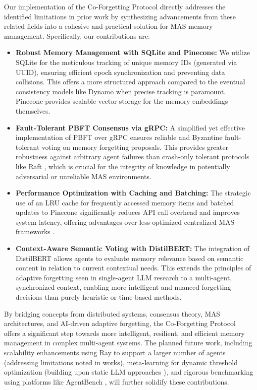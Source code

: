 \documentclass[conference]{IEEEtran}
\begin{document}
Our implementation of the Co-Forgetting Protocol directly addresses the identified limitations in prior work by synthesizing advancements from these related fields into a cohesive and practical solution for MAS memory management. Specifically, our contributions are:
\begin{itemize}
    \item \textbf{Robust Memory Management with SQLite and Pinecone:} We utilize SQLite for the meticulous tracking of unique memory IDs (generated via UUID), ensuring efficient epoch synchronization and preventing data collisions. This offers a more structured approach compared to the eventual consistency models like Dynamo \cite{DeCandia2007} when precise tracking is paramount. Pinecone provides scalable vector storage for the memory embeddings themselves.
    \item \textbf{Fault-Tolerant PBFT Consensus via gRPC:} A simplified yet effective implementation of PBFT over gRPC ensures reliable and Byzantine fault-tolerant voting on memory forgetting proposals. This provides greater robustness against arbitrary agent failures than crash-only tolerant protocols like Raft \cite{Ongaro2014}, which is crucial for the integrity of knowledge in potentially adversarial or unreliable MAS environments.
    \item \textbf{Performance Optimization with Caching and Batching:} The strategic use of an LRU cache for frequently accessed memory items and batched updates to Pinecone significantly reduces API call overhead and improves system latency, offering advantages over less optimized centralized MAS frameworks \cite{Wooldridge2009}.
    \item \textbf{Context-Aware Semantic Voting with DistilBERT:} The integration of DistilBERT allows agents to evaluate memory relevance based on semantic content in relation to current contextual needs. This extends the principles of adaptive forgetting seen in single-agent LLM research to a multi-agent, synchronized context, enabling more intelligent and nuanced forgetting decisions than purely heuristic or time-based methods.
\end{itemize}

By bridging concepts from distributed systems, consensus theory, MAS architectures, and AI-driven adaptive forgetting, the Co-Forgetting Protocol offers a significant step towards more intelligent, resilient, and efficient memory management in complex multi-agent systems. The planned future work, including scalability enhancements using Ray to support a larger number of agents (addressing limitations noted in works), meta-learning for dynamic threshold optimization (building upon static LLM approaches \cite{Finn2017}), and rigorous benchmarking using platforms like AgentBench \cite{Liu2023agentbench}, will further solidify these contributions.
\end{document}
